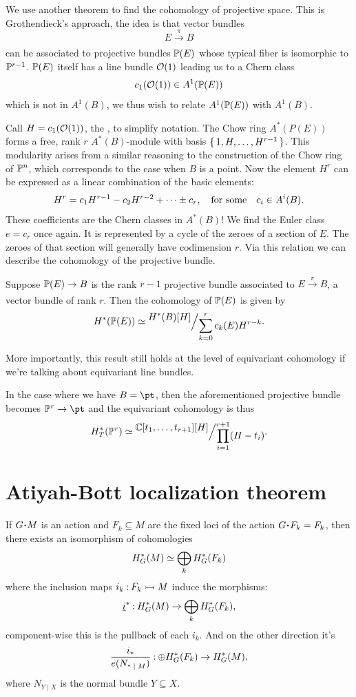 \documentclass[12pt]{memoir}
\begin{document}
We use another theorem to find the cohomology of projective space. This is Grothendieck's approach, the idea is that vector bundles 
$$E\xrightarrow[]{\pi}B$$
can be associated to projective bundles $\mathbb{P}(E)$ whose typical fiber is isomorphic to $\mathbb{P}^{r-1}$. $\mathbb{P}(E)$ itself has a line bundle $\mathcal{O}(1)$ leading us to a Chern class
$$c_1(\mathcal{O}(1))\in A^1(\mathbb{P}(E))$$
which is not in $A^1(B)$, we thus wish to relate $A^1(\mathbb{P}(E))$ with $A^1(B)$.\par
Call $H=c_1(\mathcal{O}(1))$, the , to simplify notation. The Chow ring $A^\ast(P(E))$ forms a free, rank $r$ $A^\ast(B)$-module with basis $\{\,1,H,\dots,H^{r-1}\,\}$. This modularity arises from a similar reasoning to the construction of the Chow ring of $\mathbb{P}^n$, which corresponds to the case when $B$ is a point. Now the element $H^r$ can be expressed as a linear combination of the basic elements: 
$$H^r=c_1H^{r-1}-c_2H^{r-2}+\dots\pm c_r,\quad\text{for some}\quad c_i\in A^i(B).$$
These coefficients are the Chern classes in $A^\ast(B)$! We find the Euler class $e=c_r$ once again. It is represented by a cycle of the zeroes of a section of $E$. The zeroes of that section will generally have codimension $r$. Via this relation we can describe the cohomology of the projective bundle.

\begin{Th}
    Suppose $\mathbb{P}(E)\to B$ is the rank $r-1$ projective bundle associated to $E\xrightarrow[]{\pi}B$, a vector bundle of rank $r$. Then the cohomology of $\mathbb{P}(E)$ is given by
    $$H^\ast(\bP(E))\isom\quot{H^\ast(B)[H]}{\sum_{k=0}^{r}c_k(E)H^{r-k}}.$$
\end{Th}
More importantly, this result still holds at the level of equivariant cohomology if we're talking about equivariant line bundles.

\begin{Ex}
    In the case where we have $B=\pt$, then the aforementioned projective bundle becomes $\bP^{r}\to\pt$ and the equivariant cohomology is thus 
    $$H^\ast_T(\bP^{r})\isom\quot{\bC[t_1,\dots,t_{r+1}][H]}{\prod_{i=1}^{r+1}(H-t_i)}.$$
\end{Ex}

\section{Atiyah-Bott localization theorem}

\begin{Th}
    If $G\.M$ is an action and $F_k\subseteq M$ are the fixed loci of the action $G\.F_k=F_k$, then there exists an isomorphism of cohomologies
    $$H^\ast_G(M)\simeq \bigoplus_kH^\ast_G(F_k)$$
    where the inclusion maps $i_k\mathbin{:} F_k\rightarrowtail M$ induce the morphisms:
    $$\underline{i}^\ast\mathbin{:}H^\ast_G(M)\to\bigoplus_kH^\ast_G(F_k),$$
    component-wise this is the pullback of each $i_k$. And on the other direction it's
 $$\frac{i_\ast}{e(N_{\.\mid M})}\:\oplus H^\ast_G(F_k)\to H^\ast_G(M),$$ 
 where $N_{Y\mid X}$ is the normal bundle $Y\subseteq X$.
\end{Th}
\end{document}
